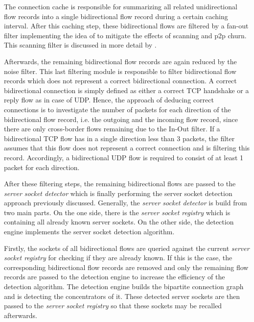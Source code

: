 The connection cache is responsible for summarizing all related unidirectional
flow records into a single bidirectional flow record during a certain caching
interval. After this caching step, these bidirectional flows are filtered by a
fan-out filter implementing the idea of \citet{Allman:2007} to mitigate the
effects of scanning and \gls{p2p} churn. This scanning filter is discussed in
more detail by \citet{Schatzmann:Mining,Schatzmann:Dissection,
Schatzmann:Tracing}.

Afterwards, the remaining bidirectional flow records are again reduced by the
noise filter. This last filtering module is responsible to filter bidirectional
flow records which does not represent a correct bidirectional connection. A
correct bidirectional connection is simply defined as either a correct \gls{TCP}
handshake or a reply flow as in case of \gls{UDP}.
Hence, the approach of deducing correct connections is to investigate the number
of packets for each direction of the bidirectional flow record, i.e. the
outgoing and the incoming flow record, since there are only cross-border flows
remaining due to the In-Out filter.
If a bidirectional \gls{TCP} flow has in a single direction less than 3
packets, the filter assumes that this flow does not represent a correct
connection and is filtering this record. Accordingly, a bidirectional \gls{UDP}
flow is required to consist of at least 1 packet for each direction.

After these filtering steps, the remaining bidirectional flows are passed to the
\emph{server socket detector} which is finally performing the
\gls{server socket} detection approach previously discussed. Generally, the
\emph{server socket detector} is build from two main parts.
On the one side, there is the \emph{server socket registry} which is
containing all already known \glspl{server socket}. On the other side, the
detection engine implements the \gls{server socket} detection algorithm.

Firstly, the sockets of all bidirectional flows are queried against the current
\emph{server socket registry} for checking if they are already known. If this is
the case, the corresponding bidirectional flow records are removed and only the
remaining flow records are passed to the detection engine to increase the
efficiency of the detection algorithm.
The detection engine builds the bipartite connection
graph and is detecting the concentrators of it. These detected \glspl{server
socket} are then passed to the \emph{server socket registry} so that these
sockets may be recalled afterwards.

